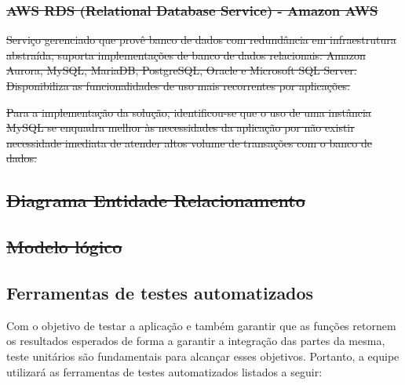 \documentclass[
    12pt,               %
    openright,          %
    oneside,
    a4paper,            %
    BIBLATEX,           %
    TODO,               %
    english,            %
    brazil              %
    ]{ifsp-spo-inf-ctds}
\providecommand{\DIFdel}[1]{{\protect\color{red}\sout{#1}}}                      %
\providecommand{\DIFdelend}{} %
\DeclareRobustCommand{\DIFdelend}{\DIFOaddend \let\includegraphics\DIFOincludegraphics} %
\begin{document}
\subsubsection{\DIFdel{AWS RDS (Relational Database Service) - Amazon AWS}}
\addtocounter{subsubsection}{-1}%

\DIFdel{Serviço gerenciado que provê banco de dados com redundância em infraestrutura abstraída, suporta implementações de banco de dados relacionais: Amazon Aurora, MySQL, MariaDB, PostgreSQL, Oracle e Microsoft SQL Server. Disponibiliza as funcionalidades de uso mais recorrentes por aplicações.
            }%

\DIFdel{Para a implementação da solução, identificou-se que o uso de uma instância MySQL se enquadra melhor às necessidades da aplicação por não existir necessidade imediata de atender altos volume de transações com o banco de dados.
    }%

\subsection{\DIFdel{Diagrama Entidade Relacionamento}}
\addtocounter{subsection}{-1}%


\subsection{\DIFdel{Modelo lógico}}
\addtocounter{subsection}{-1}%


\DIFdelend \subsection{Ferramentas de testes automatizados}

            Com o objetivo de testar a aplicação e também garantir que as funções retornem os resultados esperados de forma a garantir a integração das partes da mesma, teste unitários são fundamentais para alcançar esses objetivos. Portanto, a equipe utilizará as ferramentas de testes automatizados listados a seguir:
\end{document}
